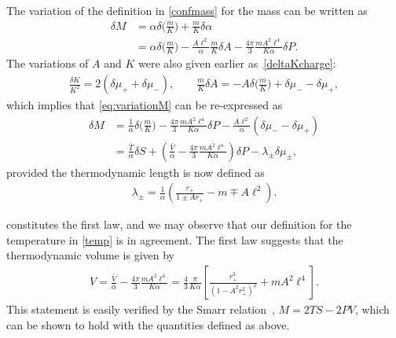 \documentclass[
twoside,
openright,
frontopenright,
]{dmathesis}
\newcommand{\nn}{\nonumber}
\newcommand{\todoopt}[2][]{\todo[color=blue!20,size=\footnotesize,#1]{#2}}
\begin{document}
The variation of the definition in \cref{confmass} for the mass can be written
as
\begin{align}
  \label{eq:variationM}
  \delta M &= \alpha \delta \Big(\frac{m}{K}\Big) + \frac{m}{K}\delta \alpha\nn\\
           &= \alpha \delta \Big(\frac{m}{K}\Big) - \frac{A\ell^2}{\alpha}\frac{m}{K}\delta A - \frac{4\pi}{3} \frac{mA^2\ell^4}{K\alpha} \delta P. 
\end{align}
The variations of $A$ and $K$ were also given earlier
as~\eqref{deltaKcharge}\todoopt{better ref}:
\begin{align}
  \frac{\delta K}{K^2} = 2  ( \delta \mu_+ + \delta \mu_-  ), \qquad \frac{m}{K}
  \delta A = - A \delta \Big(\frac{m}{K}\Big)  
 + \delta \mu_- - \delta \mu_+,
\end{align}
which implies that \cref{eq:variationM} can be re-expressed as
\begin{align}
  \label{eq:finalfirstlaw}
  \delta M & = \frac{1}{\alpha} \delta\Big(\frac{m}{K}\Big) - \frac{4\pi}{3}
             \frac{mA^2\ell^4}{K\alpha} \delta P -
             \frac{A\ell^2}{\alpha}(\delta\mu_- - \delta\mu_+)\nn\\
           &=\frac{\bar{T}}{\alpha}\delta S + \left(\frac{\bar{V}}{\alpha}-
             \frac{4\pi}{3} \frac{mA^2\ell^4}{K\alpha}\right) \delta P -
             \lambda_\pm \delta\mu_\pm,
\end{align}
provided the thermodynamic length is now defined as
\begin{align}
  \lambda_\pm = \frac{1}{\alpha}\left(\frac{r_+}{1\pm Ar_+}-m \mp A\ell^2\right).
\end{align}

 constitutes the first law, and we may observe that our
definition for the temperature in \cref{temp} is in agreement. The first law
suggests that the thermodynamic volume is given by
\begin{align}\label{vol}
  V = \frac{\bar{V}}{\alpha} - \frac{4\pi}{3} \frac{mA^2\ell^4}{K\alpha} =
  \frac{4}{3}\frac{\pi}{K \alpha}\left[\frac{r_+^3}{(1-A^2r_+^2)^2} 
  +mA^2\ell^4\right].
\end{align}
This statement is easily verified by the Smarr relation~\cite{Smarr:1972kt},
$M = 2 TS - 2PV$, which can be shown to hold with the quantities defined as
above.
\end{document}
